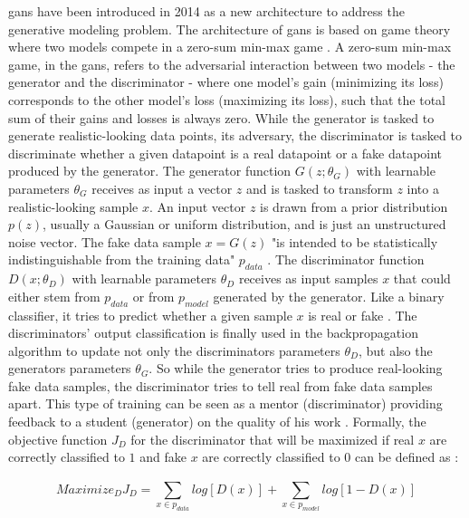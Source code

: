\Glspl{gan} \cite{NIPS2014_5ca3e9b1} have been introduced in 2014 as a new architecture to address the generative modeling problem.
The architecture of \glspl{gan} is based on game theory where two models compete in a zero-sum min-max game \cite{NIPS2014_5ca3e9b1, zhao2022CTABGANEnhancingTabular}.
A zero-sum min-max game, in the \glspl{gan}, refers to the adversarial interaction between two models - the generator and the discriminator - where one model's gain (minimizing its loss) corresponds to the other model's loss (maximizing its loss), such that the total sum of their gains and losses is always zero.
While the generator is tasked to generate realistic-looking data points, its adversary, the discriminator is tasked to discriminate whether a given datapoint is a real datapoint or a fake datapoint produced by the generator.
The generator function $G(z;\theta_G)$ with learnable parameters $\theta_G$ receives as input a vector $z$ and is tasked to transform $z$ into a realistic-looking sample $x$.
An input vector $z$ is drawn from a prior distribution $p(z)$, usually a Gaussian or uniform distribution, and is just an unstructured noise vector.
The fake data sample $x=G(z)$ "is intended to be statistically indistinguishable from the training data" $p_{data}$ \cite[p. 141]{goodfellow2020GenerativeAdversarialNetworks}.
The discriminator function $D(x;\theta_D)$ with learnable parameters $\theta_D$ receives as input samples $x$ that could either stem from $p_{data}$ or from $p_{model}$ generated by the generator.
Like a binary classifier, it tries to predict whether a given sample $x$ is real or fake \cite{NIPS2014_5ca3e9b1}.
The discriminators' output classification is finally used in the backpropagation algorithm to update not only the discriminators parameters $\theta_D$, but also the generators parameters $\theta_G$.
So while the generator tries to produce real-looking fake data samples, the discriminator tries to tell real from fake data samples apart. 
This type of training can be seen as a mentor (discriminator) providing feedback to a student (generator) on the quality of his work \cite{zhao2022CTABGANEnhancingTabular}.
Formally, the objective function $J_D$ for the discriminator that will be maximized if real $x$ are correctly classified to $1$ and fake $x$ are correctly classified to $0$ can be defined as \cite{aggarwal2018NeuralNetworksDeep}:

\begin{equation}
    \label{eqn:discriminator}
    Maximize_DJ_D= \sum_{x\in p_{data}}^{} log [D(x)] + \sum_{x\in p_{model}}^{} log [1-D(x)]
\end{equation}

